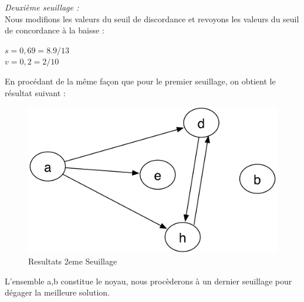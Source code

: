 \documentclass[a4paper, 11pt]{article}
\begin{document}
\emph{Deuxième seuillage :}\\
Nous modifions les valeurs du seuil de discordance et revoyons les valeurs du seuil de concordance à la baisse :\\
\begin{center}
\textbf{$s = 0,69 = 8.9/13$\\
$v= 0,2 = 2/10$}
\end{center}
En procédant de la même façon que pour le premier seuillage, on obtient le résultat suivant :\\
\begin{figure}[H]
   \begin{center}
        \includegraphics[scale=0.25]{../CR/src/Amine/3eme.png}
        \caption{
           \label{fig} Resultats 2eme Seuillage 
        }
    \end{center}
\end{figure}
L’ensemble {a,b} constitue le noyau, nous procèderons à un dernier seuillage pour dégager la meilleure solution.\\\\
\end{document}
